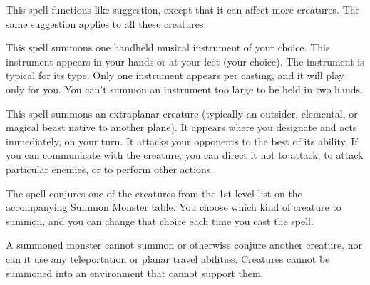 \begin{multicols}{2}
\begin{small}

\noindent This spell functions like suggestion, except that it can affect more creatures. The same suggestion applies to all these creatures.

\noindent This spell summons one handheld musical instrument of your choice. This instrument appears in your hands or at your feet (your choice). The instrument is typical for its type. Only one instrument appears per casting, and it will play only for you. You can't summon an instrument too large to be held in two hands.

\noindent This spell summons an extraplanar creature (typically an outsider, elemental, or magical beast native to another plane). It appears where you designate and acts immediately, on your turn. It attacks your opponents to the best of its ability. If you can communicate with the creature, you can direct it not to attack, to attack particular enemies, or to perform other actions.

\smallskip\noindent The spell conjures one of the creatures from the 1st-level list on the accompanying Summon Monster table. You choose which kind of creature to summon, and you can change that choice each time you cast the spell.

\smallskip\noindent A summoned monster cannot summon or otherwise conjure another creature, nor can it use any teleportation or planar travel abilities. Creatures cannot be summoned into an environment that cannot support them.


\end{small}
\end{multicols}
